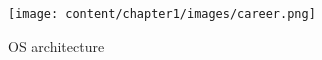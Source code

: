\begin{flushleft}

	\begin{figure}[h!]
	\centering
	\texttt{[image: content/chapter1/images/career.png]}
	\caption{OS architecture}
	\label{fig:OS_Structure}
\end{figure}


\end{flushleft}


\newpage
